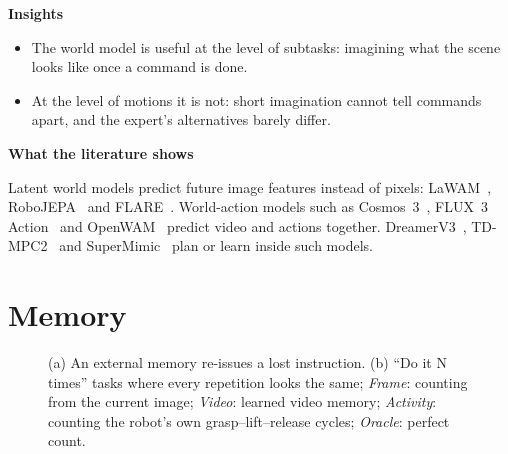 \documentclass[11pt,a4paper]{article}
\newcommand{\sub}[1]{\par\needspace{4\baselineskip}\smallskip\noindent\textbf{#1}\par}
\begin{document}
\sub{Insights}
\begin{itemize}
\item The world model is useful at the level of subtasks: imagining what the scene looks like once a command is done.
\item At the level of motions it is not: short imagination cannot tell commands apart, and the expert's alternatives barely differ.
\end{itemize}

\sub{What the literature shows}
Latent world models predict future image features instead of pixels: LaWAM~\cite{lawam}, RoboJEPA~\cite{robojepa} and FLARE~\cite{flare}. World-action models such as Cosmos~3~\cite{cosmos3}, FLUX~3 Action~\cite{flux3a} and OpenWAM~\cite{openwam} predict video and actions together. DreamerV3~\cite{dreamerv3}, TD-MPC2~\cite{tdmpc2} and SuperMimic~\cite{supermimic} plan or learn inside such models.

\section{Memory}
\label{sec:mem}
\begin{figure}[!htbp]\centering
{}\hfill
{}
\caption{(a) An external memory re-issues a lost instruction. (b) ``Do it N times'' tasks where every repetition looks the same; \emph{Frame}: counting from the current image; \emph{Video}: learned video memory; \emph{Activity}: counting the robot's own grasp--lift--release cycles; \emph{Oracle}: perfect count.}
\label{fig:mem}
\end{figure}
\end{document}
